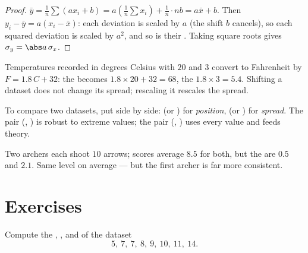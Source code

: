 \begin{proof}
$\bar y = \frac1n \sum (a x_i + b) = a\left(\frac1n\sum x_i\right) +
\frac1n \cdot nb = a\bar x + b$. Then
$y_i - \bar y = a(x_i - \bar x)$: each deviation is scaled by $a$
(the shift $b$ cancels), so each squared deviation is scaled by $a^2$,
and so is their . Taking square roots gives
$\sigma_y = \abs a\,\sigma_x$.
\end{proof}

\begin{example}
Temperatures recorded in degrees Celsius with  $20$ and  $3$ convert to Fahrenheit by $F = 1.8\,C + 32$: the 
becomes $1.8 \times 20 + 32 = 68$, the 
$1.8 \times 3 = 5.4$. Shifting a dataset does not change its spread;
rescaling it rescales the spread.
\end{example}

\begin{method}\label{met:g11:stat:compare}
To compare two datasets, put side by side:  (or ) for
\emph{position},  (or ) for
\emph{spread}. The pair (, ) is robust to
extreme values; the pair (, ) uses every value and
feeds  theory.
\end{method}

\begin{example}
Two archers each shoot $10$ arrows; scores average $8.5$ for both, but
the  are $0.5$ and $2.1$. Same level on average --- but
the first archer is far more consistent.
\end{example}

\section{Exercises}

\begin{exercise}[$\star$]\label{exo:g11:stat:1}
Compute the , ,  and  of the
dataset
\[
5,\ 7,\ 7,\ 8,\ 9,\ 10,\ 11,\ 14 .
\]
\end{exercise}

